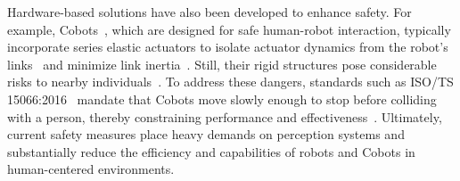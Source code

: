 Hardware-based solutions have also been developed to enhance safety. For example, \glspl{Cobot}~\cite{el2019cobot}, which are designed for safe human-robot interaction, typically incorporate series elastic actuators to isolate actuator dynamics from the robot’s links~\cite{pratt1995series} and minimize link inertia~\cite{albu2007dlr}. Still, their rigid structures pose considerable risks to nearby individuals~\cite{haddadin2013towards}. To address these dangers, standards such as ISO/TS 15066:2016~\cite{Isots_15066_2016} mandate that \glspl{Cobot} move slowly enough to stop before colliding with a person, thereby constraining performance and effectiveness~\cite{ajoudani2018progress, lucci2020combining}. Ultimately, current safety measures place heavy demands on perception systems and substantially reduce the efficiency and capabilities of robots and \glspl{Cobot} in human-centered environments.

